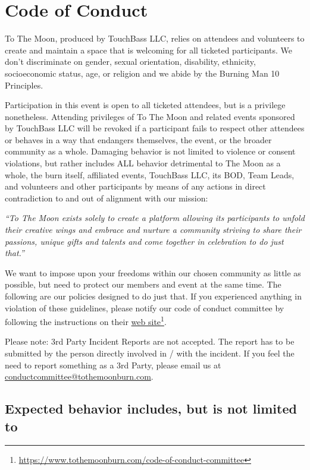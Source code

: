 \section*{Code of Conduct}
\label{coc}

To The Moon, produced by TouchBass LLC, relies on attendees and volunteers to create and maintain a space that is welcoming for all ticketed participants. We don’t discriminate on gender, sexual orientation, disability, ethnicity, socioeconomic status, age, or religion and we abide by the Burning Man 10 Principles.

Participation in this event is open to all ticketed attendees, but is a privilege nonetheless. Attending privileges of To The Moon and related events sponsored by TouchBass LLC will be revoked if a participant fails to respect other attendees or behaves in a way that endangers themselves, the event, or the broader community as a whole.
Damaging behavior is not limited to violence or consent violations, but rather includes ALL behavior detrimental to The Moon as a whole, the burn itself, affiliated events, TouchBass LLC, its BOD, Team Leads, and volunteers and other participants by means of any actions in direct contradiction to and out of alignment with our mission:

\emph{“To The Moon exists solely to create a platform allowing its participants to unfold their creative wings and embrace and nurture a community striving to share their passions, unique gifts and talents and come together in celebration to do just that.”}

We want to impose upon your freedoms within our chosen community as little as possible, but need to protect our members and event at the same time.
The following are our policies designed to do just that.
If you experienced anything in violation of these guidelines, please notify our code of conduct committee by following the instructions on their \hyperlink{https://www.tothemoonburn.com/code-of-conduct-committee}{web site}\footnote{\url{https://www.tothemoonburn.com/code-of-conduct-committee}}.

Please note: 3rd Party Incident Reports are not accepted. The report has to be submitted by the person directly involved in / with the incident. If you feel the need to report something as a 3rd Party, please email us at \url{conductcommittee@tothemoonburn.com}.

\subsection*{Expected behavior includes, but is not limited to}

